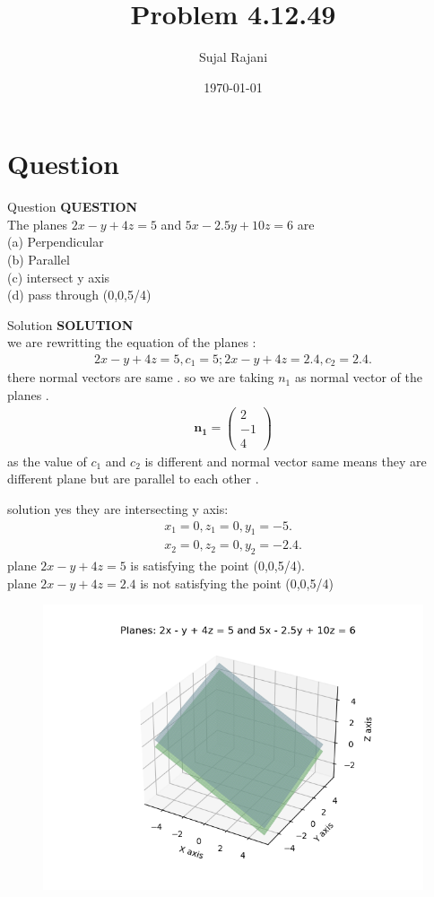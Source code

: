 \documentclass{beamer}
\title{Problem 4.12.49}
\author{Sujal Rajani}
\date{\today}
\let\vec\mathbf
\theoremstyle{remark}
\newcommand{\myvec}[1]{\ensuremath{\begin{pmatrix}#1\end{pmatrix}}}
\numberwithin{equation}{section}
\begin{document}
\begin{frame}
\titlepage
\end{frame}

\section{Question}
\begin{frame}{Question}
\textbf{QUESTION}
\\
  The planes $2 x-y+4 z=5$ and $5x-2.5 y +10 z=6$ are 
  \\
   (a) Perpendicular
   \\
   (b) Parallel
   \\
   (c) intersect y axis
   \\
   (d) pass through (0,0,5/4)
\end{frame}
\begin{frame}{Solution}
\textbf{SOLUTION}
\\
we are rewritting the equation of the planes :
\begin{align*}
    2x-y+4z=5,c_1=5;2x-y+4z=2.4,c_2=2.4.
\end{align*}
there normal vectors are same .
so we are taking $n_1$ as normal vector of the planes .
\begin{align*}
  \vec{ n_1}=\myvec{2\\-1\\4}
\end{align*}
as the value of $c_1$ and  $c_2$ is different and normal vector same means they are different plane but are parallel to each other .
\end{frame}
\begin{frame}{solution}
yes they are intersecting y axis:
\begin{align*}
    x_1=0,z_1=0,y_1=-5.
\\
  x_2=0,z_2=0,y_2=-2.4.
\end{align*}
plane $2x-y+4z=5$ is satisfying the point (0,0,5/4).
\\
plane $2x-y+4z=2.4 $ is not satisfying the point (0,0,5/4)
     \end{frame}
       \begin{frame}[fragile]
    \begin{figure}[H]
    \centering
    \includegraphics[width = 0.6\columnwidth]{../figs/img.png}
    \caption*{}
    \label{figs}
\end{figure}
\end{frame}
\end{document}
